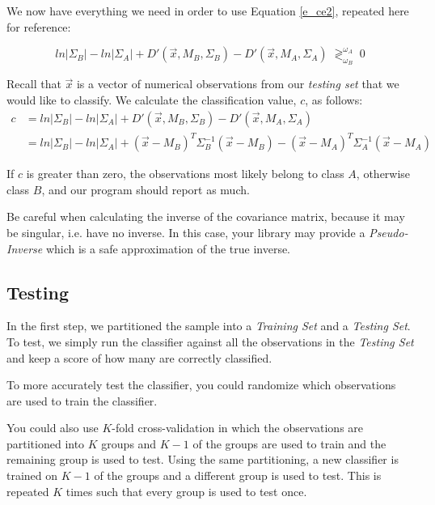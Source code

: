 \documentclass{article}
\begin{document}
We now have everything we need in order to use Equation \ref{e_ce2}, repeated
here for reference:

\begin{equation*}
ln|\Sigma_B| - ln|\Sigma_A| + D'(\vec{x},M_B,\Sigma_B) - D'(\vec{x},M_A,\Sigma_A)
\; \gtrless^{\omega_A}_{\omega_B} \; 0 
\end{equation*}

Recall that $\vec{x}$ is a vector of numerical observations from our
\emph{testing set} that we would like to classify. We calculate the
classification value, $c$, as follows:
\[\begin{split}
  c 
  &= ln|\Sigma_B| - ln|\Sigma_A| + D'(\vec{x},M_B,\Sigma_B) - D'(\vec{x},M_A,\Sigma_A) \\
  &= ln|\Sigma_B| - ln|\Sigma_A| + (\vec{x}-M_B)^T \Sigma_B^{-1} (\vec{x}-M_B) -(\vec{x}-M_A)^T \Sigma_A^{-1} (\vec{x}-M_A)
\end{split} \]

If $c$ is greater than zero, the observations most likely belong
to class $A$, otherwise class $B$, and our program should report as much.

\begin{note}
Be careful when calculating the inverse of the covariance matrix,
because it may be singular, i.e. have no inverse.  In this case, your
library may provide a \emph{Pseudo-Inverse}\cite{wiki_pinv} which is
a safe approximation of the true inverse.
\end{note}

\subsection{Testing}
\label{ss_testing}

In the first step, we partitioned the sample into a \emph{Training
  Set} and a \emph{Testing Set}.  To test, we simply run the
  classifier against all the observations in the \emph{Testing Set}
  and keep a score of how many are correctly classified.

To more accurately test the classifier, you could randomize which
observations are used to train the classifier.

You could also use $K$-fold cross-validation in which the observations
are partitioned into $K$ groups and $K-1$ of the groups are used to
train and the remaining group is used to test.  Using the same
partitioning, a new classifier is trained on $K-1$ of the groups and a
different group is used to test.  This is repeated $K$ times such that
every group is used to test once.
\end{document}

